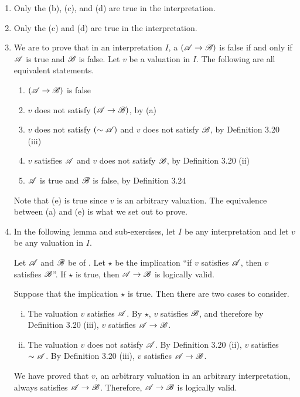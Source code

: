 \begin{enumerate}
  \item %
    Only the \wfs{} (b), (c), and (d) are true in the interpretation.

  \item %
    Only the \wfs{} (c) and (d) are true in the interpretation.

  \item %
    We are to prove that in an interpretation \(I\), a \wf{} \((\mathscr{A} \rightarrow \mathscr{B})\) is false if and only if \(\mathscr{A}\) is true and \(\mathscr{B}\) is false. Let \(v\) be a valuation in \(I\). The following are all equivalent statements.
    \begin{enumerate}[align=left]
      \item \((\mathscr{A} \rightarrow \mathscr{B})\) is false
      \item \(v\) does not satisfy \((\mathscr{A} \rightarrow \mathscr{B})\), by (a)
      \item \(v\) does not satisfy \((\sim\mathscr{A})\) and \(v\) does not satisfy \(\mathscr{B}\), by Definition 3.20 (iii)
      \item \(v\) satisfies \(\mathscr{A}\) and \(v\) does not satisfy \(\mathscr{B}\), by Definition 3.20 (ii)
      \item \(\mathscr{A}\) is true and \(\mathscr{B}\) is false, by Definition 3.24
    \end{enumerate}
    Note that (e) is true since \(v\) is an arbitrary valuation. The equivalence between (a) and (e) is what we set out to prove.

  \item %
    In the following lemma and sub-exercises, let \(I\) be any interpretation and let \(v\) be any valuation in \(I\).

    \begin{lemma*}
      Let \(\mathscr{A}\) and \(\mathscr{B}\) be \wfs{} of \cl{}. Let \(\star\) be the implication ``if \(v\) satisfies \(\mathscr{A}\), then \(v\) satisfies \(\mathscr{B}\)''. If \(\star\) is true, then \(\mathscr{A} \rightarrow \mathscr{B}\) is logically valid.

      \prf{} Suppose that the implication \(\star\) is true. Then there are two cases to consider.
      \begin{enumerate}[(i)]
        \item The valuation \(v\) satisfies \(\mathscr{A}\). By \(\star\), \(v\) satisfies \(\mathscr{B}\), and therefore by Definition 3.20 (iii), \(v\) satisfies \(\mathscr{A} \rightarrow \mathscr{B}\).
        \item The valuation \(v\) does not satisfy \(\mathscr{A}\). By Definition 3.20 (ii), \(v\) satisfies \(\sim\mathscr{A}\). By Definition 3.20 (iii), \(v\) satisfies \(\mathscr{A} \rightarrow \mathscr{B}\).
      \end{enumerate}
      We have proved that \(v\), an arbitrary valuation in an arbitrary interpretation, always satisfies \(\mathscr{A} \rightarrow \mathscr{B}\). Therefore, \(\mathscr{A} \rightarrow \mathscr{B}\) is logically valid.


\end{lemma*}
\end{enumerate}
